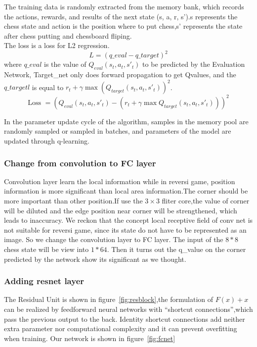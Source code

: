 \documentclass[10pt,twocolumn,letterpaper]{article}
\begin{document}
The training data is randomly extracted from the memory bank, which records the actions, rewards, and results of the next state (s, a, r, s').s represents the chess state and action is the position where to put chess,s' represents the state after chess putting and chessboard fliping.\\

The loss is a loss for L2 regression. $$L = \left(q\_eval-q\_target\right)^{2}$$ where $q\_eval$ is the value of $Q_{eval}(s_{t}, a_{t},s'_{t})$ to be predicted by the Evaluation Network, Target\_net only does forward propagation to get Qvalues, and the  $q\_targetl$ is equal to $r_{t}+\gamma \max \left(Q_{target}\left(s_{t}, a_{t},s'_{t}\right)\right)^{2}$.
$$
\text {Loss }=\left(Q_{eval}(s_{t}, a_{t},s'_{t})-\left(r_{t}+\gamma \max Q_{target}\left(s_{t}, a_{t},s'_{t}\right)\right)\right)^{2}
$$



In the parameter update cycle of the algorithm, samples in the memory pool are randomly sampled or sampled in batches, and parameters of the model are updated through q-learning.
\subsubsection{Change from convolution to FC layer}
\quad Convolution layer learn the local information while in reversi game, position information is more significant than local area information.The corner should be more important than other position.If use the $3 \times 3$ fliter core,the value of corner will be diluted and the edge position near corner will be strengthened, which leads to inaccuracy. We reckon that the concept local receptive field of conv net is not suitable for reversi game, since its state do not have to be represented as an image. So we change the convolution layer to FC layer. The input of the $8*8$ chess state will be view into $1*64$. Then it turns out the q\_value on the corner predicted by the network show its significant as we thought.
\subsubsection{Adding resnet layer}
\quad The Residual Unit is shown in figure~\ref{fig:resblock},the formulation of $F (x) + x $ can be realized by feedforward neural networks with “shortcut connections”,which pass the previous output to the back. Identity shortcut connections add neither extra parameter nor computational complexity and it can prevent overfitting when training. Our network is shown in figure~\ref{fig:fcnet}
\end{document}
